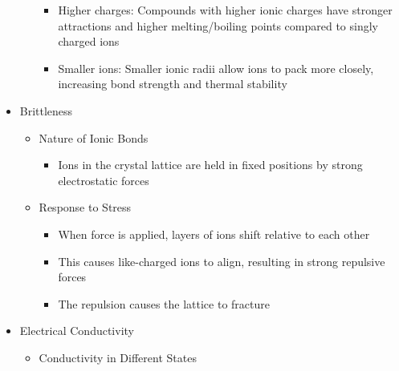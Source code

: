 \begin{itemize}
\begin{itemize}
        \begin{itemize}

          \item Higher charges: Compounds with higher ionic charges have stronger attractions and higher melting/boiling points compared to singly charged ions

          \item Smaller ions: Smaller ionic radii allow ions to pack more closely, increasing bond strength and thermal stability

        \end{itemize}

    \end{itemize}

  \item Brittleness

    \begin{itemize}

      \item Nature of Ionic Bonds

        \begin{itemize}

          \item Ions in the crystal lattice are held in fixed positions by strong electrostatic forces

        \end{itemize}

      \item Response to Stress

        \begin{itemize}

          \item When force is applied, layers of ions shift relative to each other

          \item This causes like-charged ions to align, resulting in strong repulsive forces

          \item The repulsion causes the lattice to fracture

        \end{itemize}

    \end{itemize}

  \item Electrical Conductivity

    \begin{itemize}

      \item Conductivity in Different States


\end{itemize}
\end{itemize}
